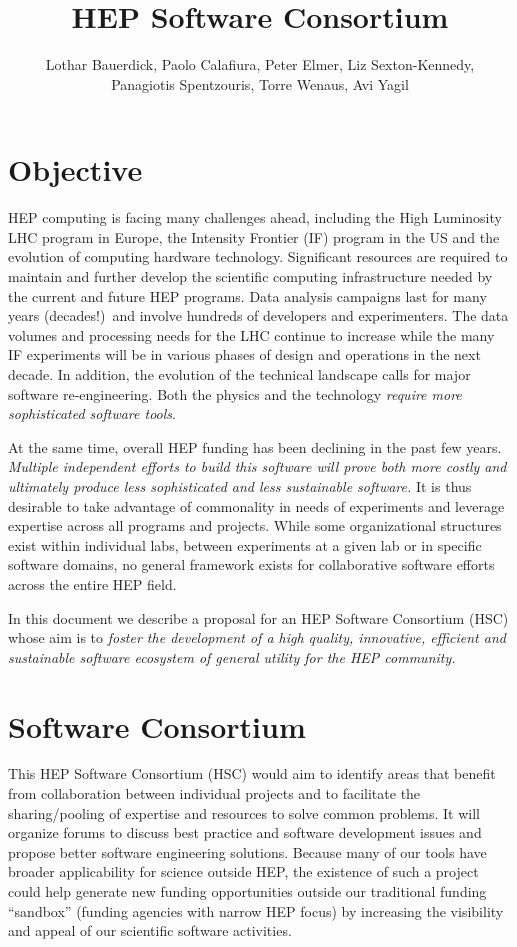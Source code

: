 \documentclass[12pt,letterpaper,fleqn]{article}
\author{Lothar Bauerdick, Paolo Calafiura, Peter Elmer, Liz Sexton-Kennedy, \\
Panagiotis Spentzouris, Torre Wenaus, Avi Yagil}
\title{HEP Software Consortium}
\begin{document}
\maketitle
\linenumbers

\section{Objective}
\label{sec:objective}


HEP computing is facing many challenges ahead, including the High
Luminosity LHC program in Europe, the Intensity Frontier (IF) program
in the US and the evolution of computing hardware technology.
Significant resources are required to maintain and further develop
the scientific computing infrastructure needed by the current and
future HEP programs.  Data analysis campaigns last for many years
(decades!)\ and involve hundreds of developers and experimenters.
The data volumes and processing needs for the LHC continue to
increase  while the many IF
experiments will be in various phases of design and operations in
the next decade.  In addition, the evolution of the technical
landscape calls for major software re-engineering. Both the
physics and the technology {\em require more sophisticated software
tools}.

At the same time, overall HEP funding has been declining in the past
few years. {\em Multiple independent efforts to build this software
will prove both more costly and ultimately produce less
sophisticated and less sustainable software.} It is thus
desirable to take advantage of commonality in
needs of experiments and leverage expertise across all programs and
projects. While some organizational structures exist within individual
labs, between experiments at a given lab or in specific software domains,
no general framework exists for collaborative software efforts across the entire HEP field.

In this document we describe a proposal for an HEP Software Consortium
(HSC) whose aim is to {\em foster the development of a high quality,
innovative, efficient and sustainable software ecosystem of general
utility for the HEP community.}





\section{Software Consortium}
\label{sec:consortium}

This HEP Software Consortium
(HSC) would aim to identify areas that benefit from collaboration
between individual projects and to facilitate the sharing/pooling
of expertise and resources to solve common problems.  It will
organize forums to discuss best practice and software development
issues and propose better software engineering solutions. 
Because many of our tools have broader applicability for science
outside HEP, the existence of such a project could help generate
new funding opportunities outside our traditional funding ``sandbox''
(funding agencies with narrow HEP focus) by increasing the visibility
and appeal of our scientific software activities.
\end{document}
